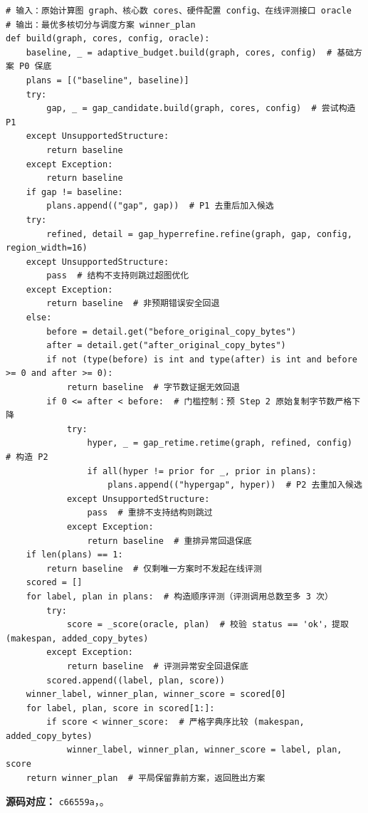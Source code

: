 \documentclass[anonymous,notoc]{gmcm2026}
\begin{document}
\FloatBarrier
\begin{algorithm}[!htbp]
\caption{问题二自适应超图细化与多核调度算法}\label{alg:p2-adaptive-hypergap}
\small


\begin{lstlisting}[style=paperpseudo]
# 输入：原始计算图 graph、核心数 cores、硬件配置 config、在线评测接口 oracle
# 输出：最优多核切分与调度方案 winner_plan
def build(graph, cores, config, oracle):
    baseline, _ = adaptive_budget.build(graph, cores, config)  # 基础方案 P0 保底
    plans = [("baseline", baseline)]
    try:
        gap, _ = gap_candidate.build(graph, cores, config)  # 尝试构造 P1
    except UnsupportedStructure:
        return baseline
    except Exception:
        return baseline
    if gap != baseline:
        plans.append(("gap", gap))  # P1 去重后加入候选
    try:
        refined, detail = gap_hyperrefine.refine(graph, gap, config, region_width=16)
    except UnsupportedStructure:
        pass  # 结构不支持则跳过超图优化
    except Exception:
        return baseline  # 非预期错误安全回退
    else:
        before = detail.get("before_original_copy_bytes")
        after = detail.get("after_original_copy_bytes")
        if not (type(before) is int and type(after) is int and before >= 0 and after >= 0):
            return baseline  # 字节数证据无效回退
        if 0 <= after < before:  # 门槛控制：预 Step 2 原始复制字节数严格下降
            try:
                hyper, _ = gap_retime.retime(graph, refined, config)  # 构造 P2
                if all(hyper != prior for _, prior in plans):
                    plans.append(("hypergap", hyper))  # P2 去重加入候选
            except UnsupportedStructure:
                pass  # 重排不支持结构则跳过
            except Exception:
                return baseline  # 重排异常回退保底
    if len(plans) == 1:
        return baseline  # 仅剩唯一方案时不发起在线评测
    scored = []
    for label, plan in plans:  # 构造顺序评测（评测调用总数至多 3 次）
        try:
            score = _score(oracle, plan)  # 校验 status == 'ok'，提取 (makespan, added_copy_bytes)
        except Exception:
            return baseline  # 评测异常安全回退保底
        scored.append((label, plan, score))
    winner_label, winner_plan, winner_score = scored[0]
    for label, plan, score in scored[1:]:
        if score < winner_score:  # 严格字典序比较 (makespan, added_copy_bytes)
            winner_label, winner_plan, winner_score = label, plan, score
    return winner_plan  # 平局保留靠前方案，返回胜出方案
\end{lstlisting}
\textbf{源码对应：} \texttt{c66559a}，\texttt{}。

\end{algorithm}
\FloatBarrier
\end{document}
